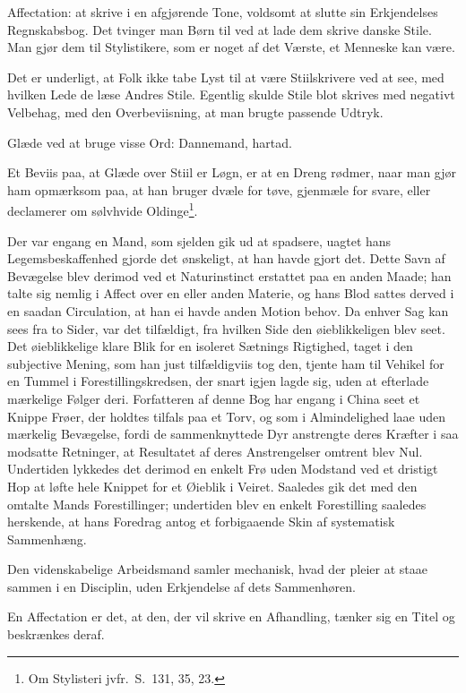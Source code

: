 \documentclass[12pt]{article}
\newcommand{\opage}[1]{\marginnote{\footnotesize\textit{[#1]}}}
\begin{document}
Affectation: at skrive i en afgjørende Tone, voldsomt at slutte sin Erkjendelses Regnskabsbog. Det tvinger man Børn til ved at lade dem skrive danske Stile. Man gjør dem til Stylistikere, som er noget af det Værste, et Menneske kan være.

Det er underligt, at Folk ikke tabe Lyst til at være Stiilskrivere ved at see, med hvilken Lede de læse Andres Stile. Egentlig skulde Stile blot skrives med negativt Velbehag, med den Overbeviisning, at man brugte passende Udtryk.

Glæde ved at bruge visse Ord: Dannemand, hartad.

Et Beviis paa, at Glæde over Stiil er Løgn, er at en Dreng rødmer, naar man gjør ham opmærksom paa, at han bruger dvæle for tøve, gjenmæle for svare, eller declamerer om sølvhvide Oldinge\footnote{Om Stylisteri jvfr.\ S.\ 131, 35, 23.}.

\opage{187}Der var engang en Mand, som sjelden gik ud at spadsere, uagtet hans Legemsbeskaffenhed gjorde det ønskeligt, at han havde gjort det. Dette Savn af Bevægelse blev derimod ved et Naturinstinct erstattet paa en anden Maade; han talte sig nemlig i Affect over en eller anden Materie, og hans Blod sattes derved i en saadan Circulation, at han ei havde anden Motion behov. Da enhver Sag kan sees fra to Sider, var det tilfældigt, fra hvilken Side den øieblikkeligen blev seet. Det øieblikkelige klare Blik for en isoleret Sætnings Rigtighed, taget i den subjective Mening, som han just tilfældigviis tog den, tjente ham til Vehikel for en Tummel i Forestillingskredsen, der snart igjen lagde sig, uden at efterlade mærkelige Følger deri. Forfatteren af denne Bog har engang i China seet et Knippe Frøer, der holdtes tilfals paa et Torv, og som i Almindelighed laae uden mærkelig Bevægelse, fordi de sammenknyttede Dyr anstrengte deres Kræfter i saa modsatte Retninger, at Resultatet af deres Anstrengelser omtrent blev Nul. Undertiden lykkedes det derimod en enkelt Frø uden Modstand ved et dristigt Hop at løfte hele Knippet for et Øieblik i Veiret. Saaledes gik det med den omtalte Mands Forestillinger; undertiden blev en enkelt Forestilling saaledes herskende, at hans Foredrag antog et forbigaaende Skin af systematisk Sammenhæng.

Den videnskabelige Arbeidsmand samler mechanisk, hvad der pleier at staae sammen i en Disciplin, uden Erkjendelse af dets Sammenhøren.

En Affectation er det, at den, der vil skrive en Afhandling, tænker sig en Titel og beskrænkes deraf.
\end{document}

